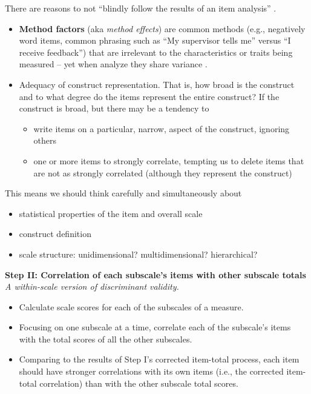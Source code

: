 \documentclass[
  english,
]{book}
\providecommand{\tightlist}{%
  \setlength{\itemsep}{0pt}\setlength{\parskip}{0pt}}
\begin{document}
There are reasons to not ``blindly follow the results of an item analysis'' \citep{green_using_2010}.

\begin{itemize}
\tightlist
\item
  \textbf{Method factors} (aka \emph{method effects}) are common methods (e.g., negatively word items, common phrasing such as ``My supervisor tells me'' versus ``I receive feedback'') that are irrelevant to the characteristics or traits being measured -- yet when analyze they share variance \citep{chyung_evidencebased_2018}.
\item
  Adequacy of construct representation. That is, how broad is the construct and to what degree do the items represent the entire construct? If the construct is broad, but there may be a tendency to

  \begin{itemize}
  \tightlist
  \item
    write items on a particular, narrow, aspect of the construct, ignoring others
  \item
    one or more items to strongly correlate, tempting us to delete items that are not as strongly correlated (although they represent the construct)
  \end{itemize}
\end{itemize}

This means we should think carefully and simultaneously about

\begin{itemize}
\tightlist
\item
  statistical properties of the item and overall scale
\item
  construct definition
\item
  scale structure: unidimensional? multidimensional? hierarchical?
\end{itemize}

\textbf{Step II: Correlation of each subscale's items with other subscale totals}
\emph{A within-scale version of discriminant validity.}

\begin{itemize}
\tightlist
\item
  Calculate scale scores for each of the subscales of a measure.
\item
  Focusing on one subscale at a time, correlate each of the subscale's items with the total scores of all the other subscales.
\item
  Comparing to the results of Step I's corrected item-total process, each item should have stronger correlations with its own items (i.e., the corrected item-total correlation) than with the other subscale total scores.
\end{itemize}
\end{document}
